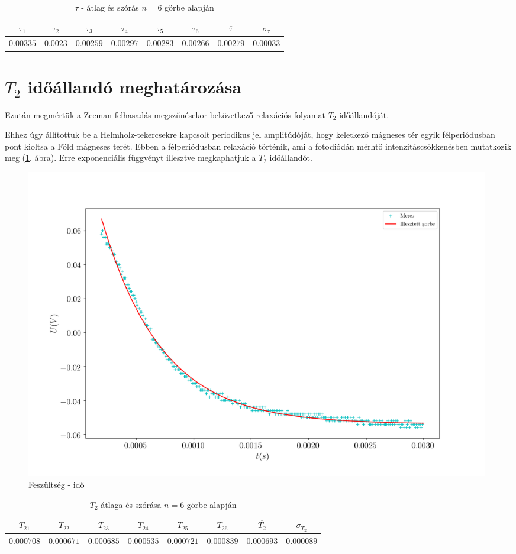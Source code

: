 \documentclass[12pt]{article}
\theoremstyle{plain}
\begin{document}
\begin{table}[H]
\begin{tabular}{|c|c|c|c|c|c|c|c|}
 \hline
 $\tau_1$ & $\tau_2$ & $\tau_3$ & $\tau_4$ & $\tau_5$ & $\tau_6$ & $\overline{\tau}$ & $\sigma_{\tau}$ \\ \hline
 $0.00335$ & $0.0023$ & $0.00259$ & $0.00297$ & $0.00283$ & $0.00266$ & $0.00279$ & $0.00033$ \\ \hline
\end{tabular}
\caption{$\tau$ - átlag és szórás $n=6$ görbe alapján}
\label{tab:1}
\end{table}

\section{$T_2$ időállandó meghatározása}

\par Ezután megmértük a Zeeman felhasadás megszűnésekor bekövetkező relaxációs folyamat $T_2$ időállandóját.
\par Ehhez úgy állítottuk be a Helmholz-tekercsekre kapcsolt periodikus jel amplitúdóját, hogy keletkező
mágneses tér egyik félperiódusban pont kioltsa a Föld mágneses terét. Ebben a félperiódusban relaxáció
történik, ami a fotodiódán mérhtő intenzitáscsökkenésben mutatkozik meg (\ref{fig:2}. ábra). Erre exponenciális függvényt illesztve
megkaphatjuk a $T_2$ időállandót.

\begin{figure}[H]
\centering
\includegraphics[width=0.99\textwidth]{j/t22.png}
\caption{Feszültség - idő}
\label{fig:2}
\end{figure}

\begin{table}[H]
\begin{tabular}{|c|c|c|c|c|c|c|c|}
 \hline
 $T_{21}$ & $T_{22}$ & $T_{23}$ & $T_{24}$ & $T_{25}$ & $T_{26}$ & $\overline{T_{2}}$ & $\sigma_{T_2}$ \\ \hline
 $0.000708$ & $0.000671$ & $0.000685$ & $0.000535$ & $0.000721$ & $0.000839$ & $0.000693$ & $0.000089$ \\ \hline
\end{tabular}
\caption{$T_2$ átlaga és szórása $n=6$ görbe alapján}
\label{tab:2}
\end{table}
\end{document}
